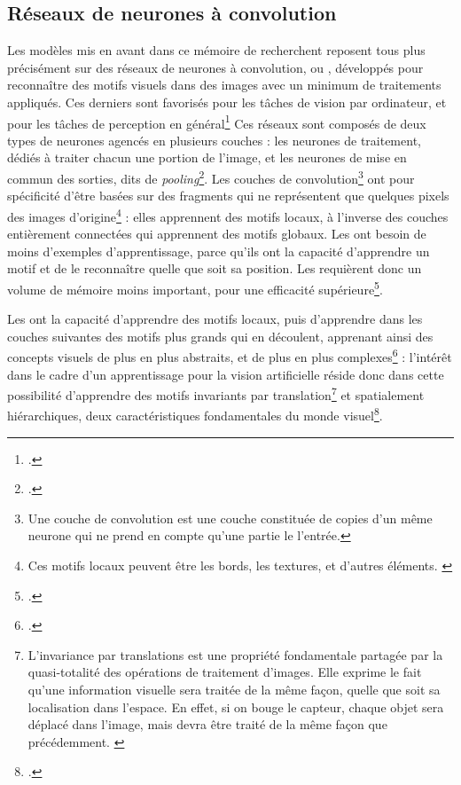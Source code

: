     \subsection{Réseaux de neurones à convolution}
    Les modèles mis en avant dans ce mémoire de recherchent reposent tous plus précisément sur des réseaux de neurones à convolution, ou \cnn, développés pour reconnaître des motifs visuels dans des images avec un minimum de traitements appliqués. Ces derniers sont favorisés pour les tâches de vision par ordinateur, et pour les tâches de perception en général\footcite{cholletApprentissageProfondAvec2020a} Ces réseaux sont composés de deux types de neurones agencés en plusieurs couches : les neurones de traitement, dédiés à traiter chacun une portion de l'image, et les neurones de mise en commun des sorties, dits de \textit{pooling}\footcite{goodfellowDeepLearning2016}. Les couches de convolution\footnote{Une couche de convolution est une couche constituée de copies d'un même neurone qui ne prend en compte qu'une partie le l'entrée.} ont pour spécificité d'être basées sur des fragments qui ne représentent que quelques pixels des images d'origine\footnote{Ces motifs locaux peuvent être les bords, les textures, et d'autres éléments. \cite{cholletApprentissageProfondAvec2020a}} : elles apprennent des motifs locaux, à l'inverse des couches entièrement connectées qui apprennent des motifs globaux. Les \cnn ont besoin de moins d'exemples d'apprentissage, parce qu'ils ont la capacité d'apprendre un motif et de le reconnaître quelle que soit sa position. Les \cnn requièrent donc un volume de mémoire moins important, pour une efficacité supérieure\footcite{goodfellowDeepLearning2016}. 
    
    Les \cnn ont la capacité d'apprendre des motifs locaux, puis d'apprendre dans les couches suivantes des motifs plus grands qui en découlent, apprenant ainsi des concepts visuels de plus en plus abstraits, et de plus en plus complexes\footcite{cholletApprentissageProfondAvec2020a} : l'intérêt dans le cadre d'un apprentissage pour la vision artificielle réside donc dans cette possibilité d'apprendre des motifs invariants par translation\footnote{\og  L'invariance par translations est une propriété fondamentale partagée par la quasi-totalité des opérations de traitement d'images. Elle exprime le fait qu'une information visuelle sera traitée de la même façon, quelle que soit sa localisation dans l'espace. En effet, si on bouge le capteur, chaque objet sera déplacé dans l'image, mais devra être traité de la même façon que précédemment. \fg \cite{ronseInvarianceParTranslations}} et spatialement hiérarchiques, deux caractéristiques fondamentales du monde visuel\footcite{cholletApprentissageProfondAvec2020a}.

